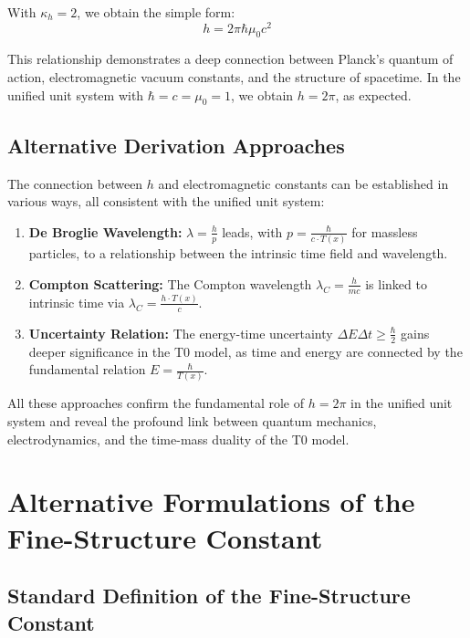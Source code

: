 \documentclass[12pt,a4paper]{article}
\newcommand{\Tfield}{T(x)}
\begin{document}
	With \(\kappa_h = 2\), we obtain the simple form:
	\begin{equation}
		h = 2\pi\hbar \mu_0 c^2
	\end{equation}
	
	This relationship demonstrates a deep connection between Planck’s quantum of action, electromagnetic vacuum constants, and the structure of spacetime. In the unified unit system with \(\hbar = c = \mu_0 = 1\), we obtain \(h = 2\pi\), as expected.
	
	\subsection{Alternative Derivation Approaches}
	
	The connection between \(h\) and electromagnetic constants can be established in various ways, all consistent with the unified unit system:
	
	\begin{enumerate}
		\item \textbf{De Broglie Wavelength:} \(\lambda = \frac{h}{p}\) leads, with \(p = \frac{\hbar}{c \cdot \Tfield}\) for massless particles, to a relationship between the intrinsic time field and wavelength.
		\item \textbf{Compton Scattering:} The Compton wavelength \(\lambda_C = \frac{h}{mc}\) is linked to intrinsic time via \(\lambda_C = \frac{h \cdot \Tfield}{c}\).
		\item \textbf{Uncertainty Relation:} The energy-time uncertainty \(\Delta E \Delta t \geq \frac{\hbar}{2}\) gains deeper significance in the T0 model, as time and energy are connected by the fundamental relation \(E = \frac{\hbar}{\Tfield}\).
	\end{enumerate}
	
	All these approaches confirm the fundamental role of \(h = 2\pi\) in the unified unit system and reveal the profound link between quantum mechanics, electrodynamics, and the time-mass duality of the T0 model.
	
	\section{Alternative Formulations of the Fine-Structure Constant}
	
	\subsection{Standard Definition of the Fine-Structure Constant}
	
\end{document}
